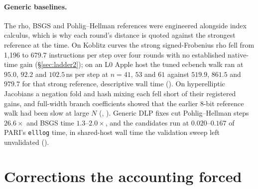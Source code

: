 \paragraph{Generic baselines.} The rho, BSGS and Pohlig--Hellman
references were engineered alongside index calculus, which is why each
round's distance is quoted against the strongest reference at the time. On
Koblitz curves the strong signed-Frobenius rho fell from 1{,}196 to 679.7
instructions per step over four rounds with no established native-time gain
(\S\ref{sec:ladder2}); on an L0 Apple host the tuned ecbench walk ran at
$95.0$, $92.2$ and $102.5$\,ns per step at $n=41$, $53$ and $61$ against
$519.9$, $861.5$ and $979.7$ for that strong reference, descriptive wall
time (). On
hyperelliptic Jacobians a negation fold and hash mixing each fell short
of their registered gains, and full-width branch coefficients showed that
the earlier 8-bit reference walk had been slow at large $N$
(,
).
Generic DLP fixes cut Pohlig--Hellman steps $26.6\times$ and BSGS time
$1.3$--$2.0\times$, and the candidates run at $0.020$--$0.167$ of PARI's
\texttt{elllog} time, in shared-host wall time the validation sweep left
unvalidated ().

\section{Corrections the accounting forced}\label{sec:corrections}

